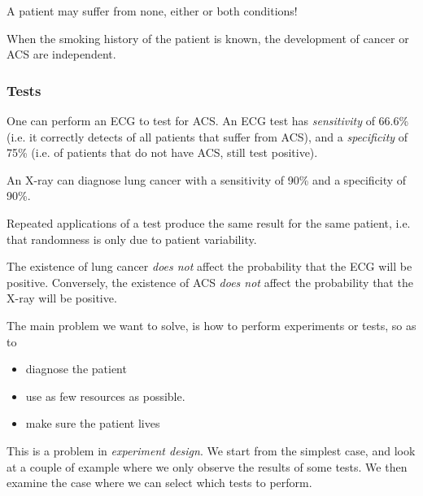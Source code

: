 \documentclass[twoside,a4paper]{article}
\begin{document}
\begin{assumption}
  A patient may suffer from none, either or both conditions!
\end{assumption}

\begin{assumption}
  When the smoking history of the patient is known, the development of cancer or ACS are independent.
\end{assumption}


\subsubsection{Tests}
One can perform an ECG to test for ACS. An ECG test has \emph{sensitivity} of 66.6\% (i.e. it correctly detects  of all patients that suffer from ACS), and a \emph{specificity} of 75\% (i.e.  of patients that do not have ACS, still test positive). 

An X-ray can diagnose lung cancer with a sensitivity of 90\% and a specificity of 90\%. 

\begin{assumption}
  Repeated applications of a test produce the same result for the same
  patient, i.e. that randomness is only due to patient variability.
\end{assumption}

\begin{assumption}
  The existence of lung cancer \emph{does not} affect the probability that the ECG will be positive. Conversely, the existence of ACS \emph{does not} affect the probability that the X-ray will be positive.
\end{assumption}

The main problem we want to solve, is how to perform experiments or
tests, so as to
\begin{itemize}
\item diagnose the patient
\item use as few resources as possible.
\item make sure the patient lives
\end{itemize}
This is a problem in \emph{experiment design}. We start from the simplest case, and look at a couple of example where we only observe the results of some tests.
We then examine the case where we can select which tests to perform.
\end{document}
